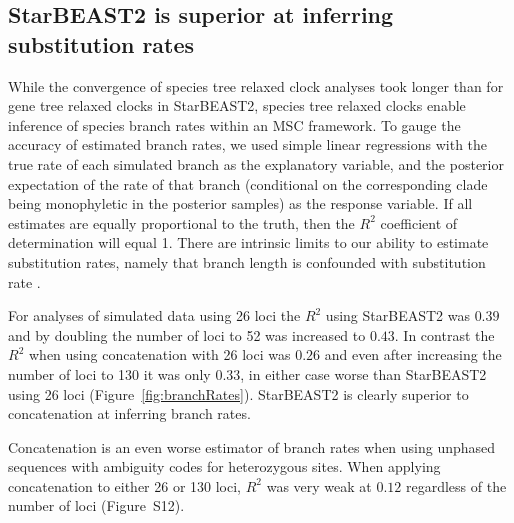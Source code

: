 \documentclass[12pt]{article}
\begin{document}
\subsection{StarBEAST2 is superior at inferring substitution rates}

While the convergence of species tree relaxed clock analyses took longer than
for gene tree relaxed clocks in StarBEAST2, species tree relaxed clocks enable
inference of species branch rates within an MSC framework. To gauge the
accuracy of estimated branch rates, we used simple linear regressions with the
true rate of each simulated branch as the explanatory variable, and the
posterior expectation of the rate of that branch (conditional on the
corresponding clade being monophyletic in the posterior samples) as the
response variable. If all estimates are equally proportional to the truth,
then the $R^2$ coefficient of determination will equal 1. There are intrinsic
limits to our ability to estimate substitution rates, namely that branch
length is confounded with substitution rate \citep{Thorne01092002}.

For analyses of simulated data using 26 loci the $R^2$ using StarBEAST2 was
$0.39$ and by doubling the number of loci to 52 was increased to $0.43$. In
contrast the $R^2$ when using concatenation with 26 loci was $0.26$ and even after
increasing the number of loci to 130 it was only $0.33$, in either case worse
than StarBEAST2 using 26 loci (Figure~\ref{fig:branchRates}). StarBEAST2 is
clearly superior to concatenation at inferring branch rates.

Concatenation is an even worse estimator of branch rates when using unphased
sequences with ambiguity codes for heterozygous sites. When applying
concatenation to either 26 or 130 loci, $R^2$ was very weak at $0.12$ regardless
of the number of loci (Figure~S12).
\end{document}
